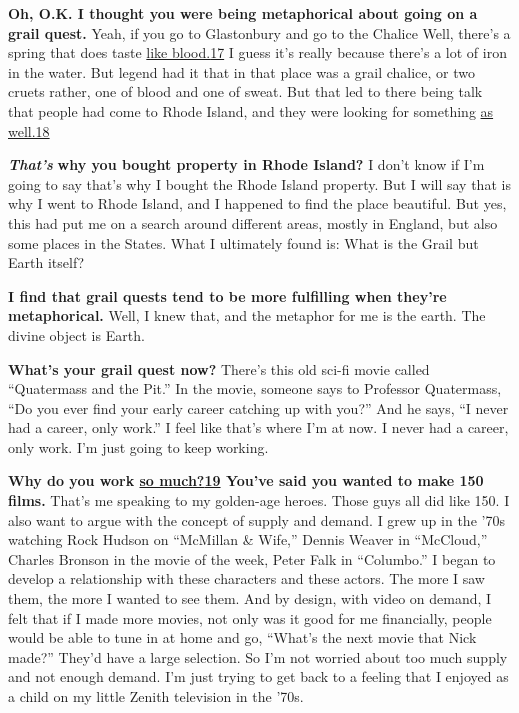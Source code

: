 \textbf{Oh, O.K. I thought you were being metaphorical about going on a
grail quest.} Yeah, if you go to Glastonbury and go to the Chalice Well,
there's a spring that does taste
\href{http://nytimes3xbfgragh.onion\#tooltip-17}{like
blood.}\href{http://nytimes3xbfgragh.onion\#tooltip-17}{17} I guess it's
really because there's a lot of iron in the water. But legend had it
that in that place was a grail chalice, or two cruets rather, one of
blood and one of sweat. But that led to there being talk that people had
come to Rhode Island, and they were looking for something
\href{http://nytimes3xbfgragh.onion\#tooltip-18}{as well.18}

\emph{\textbf{That's}} \textbf{why you bought property in Rhode Island?}
I don't know if I'm going to say that's why I bought the Rhode Island
property. But I will say that is why I went to Rhode Island, and I
happened to find the place beautiful. But yes, this had put me on a
search around different areas, mostly in England, but also some places
in the States. What I ultimately found is: What is the Grail but Earth
itself?

\textbf{I find that grail quests tend to be more fulfilling when they're
metaphorical.} Well, I knew that, and the metaphor for me is the earth.
The divine object is Earth.

\textbf{What's your grail quest now?} There's this old sci-fi movie
called ``Quatermass and the Pit.'' In the movie, someone says to
Professor Quatermass, ``Do you ever find your early career catching up
with you?'' And he says, ``I never had a career, only work.'' I feel
like that's where I'm at now. I never had a career, only work. I'm just
going to keep working.

\textbf{Why do you work
\href{http://nytimes3xbfgragh.onion\#tooltip-19}{so
much?}\href{http://nytimes3xbfgragh.onion\#tooltip-19}{19} You've said
you wanted to make 150 films.} That's me speaking to my golden-age
heroes. Those guys all did like 150. I also want to argue with the
concept of supply and demand. I grew up in the '70s watching Rock Hudson
on ``McMillan \& Wife,'' Dennis Weaver in ``McCloud,'' Charles Bronson
in the movie of the week, Peter Falk in ``Columbo.'' I began to develop
a relationship with these characters and these actors. The more I saw
them, the more I wanted to see them. And by design, with video on
demand, I felt that if I made more movies, not only was it good for me
financially, people would be able to tune in at home and go, ``What's
the next movie that Nick made?'' They'd have a large selection. So I'm
not worried about too much supply and not enough demand. I'm just trying
to get back to a feeling that I enjoyed as a child on my little Zenith
television in the '70s.

